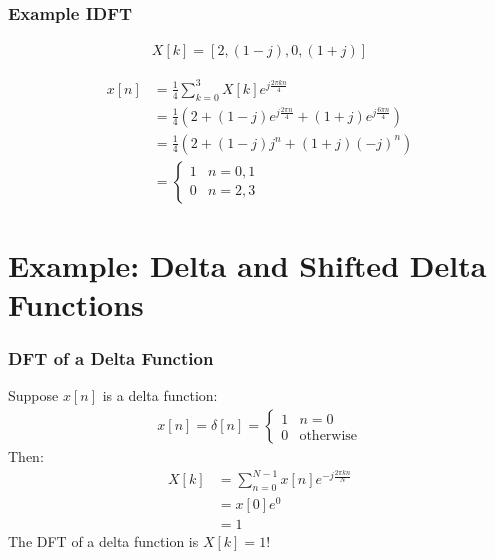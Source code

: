\documentclass{beamer}
\begin{document}
\begin{frame}
  \frametitle{Example IDFT}
  
  \begin{align*}
    X[k] = [ 2, (1-j), 0, (1+j) ]
  \end{align*}

  \begin{align*}
    x[n] &= \frac{1}{4}\sum_{k=0}^3 X[k]e^{j\frac{2\pi kn}{4}}\\
    &= \frac{1}{4}\left(2+ (1-j)e^{j\frac{2\pi n}{4}}+(1+j)e^{j\frac{6\pi n}{4}}\right)\\
    &= \frac{1}{4}\left(2+ (1-j)j^n +(1+j)(-j)^n\right)\\
    &=\begin{cases}
    1 & n=0,1\\
    0 & n=2,3
    \end{cases}
  \end{align*}
\end{frame}


\section[Delta]{Example: Delta and Shifted Delta Functions}
\setcounter{subsection}{1}

\begin{frame}
  \frametitle{DFT of a Delta Function}

  Suppose $x[n]$ is a delta function:
  \begin{align*}
    x[n] = \delta[n]=\begin{cases}1&n=0\\0&\text{otherwise}\end{cases}
  \end{align*}
  Then:
  \begin{align*}
    X[k] &= \sum_{n=0}^{N-1}x[n]e^{-j\frac{2\pi kn}{N}}\\
    &= x[0]e^{0}\\
    &= 1
  \end{align*}
  The DFT of a delta function is $X[k]=1$!
\end{frame}
\end{document}
